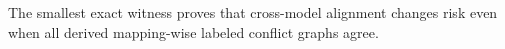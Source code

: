 The smallest exact witness proves that cross-model alignment changes risk even when all derived mapping-wise labeled conflict graphs agree.